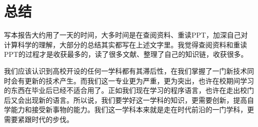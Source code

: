 \documentclass{article}
\begin{document}


\section{总结}
写本报告大约用了一天的时间，大多时间是在查阅资料、重读PPT，加深自己对计算科学的理解，大部分的总结其实都写在上述文字里。我觉得查阅资料和重读PPT的过程才是收获最多的，读了很多文献、整理了自己的知识链，收获很多。\par
我们应该认识到高校开设的任何一学科都有其滞后性，在我们掌握了一门新技术同时会有更新的技术产生。而我们这一专业更为严重，更为突出，也许在校期间学习的东西在毕业后已经不适合用了。正如我们现在学习的程序语言，也许在走出校门后又会出现新的语言。所以说，我们要学好这一学科的知识，更需要创新，提高自学能力和接受新事物的能力。我们这一学科本来就是走在时代前沿的一门学科，更需要紧跟时代的步伐。


\newpage
\end{document}
